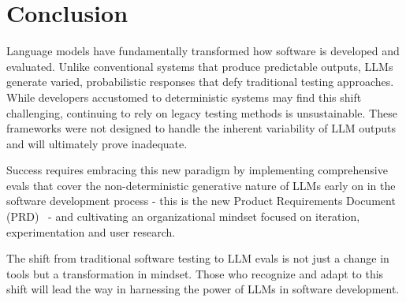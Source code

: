 \section{Conclusion}

Language models have fundamentally transformed how software is developed and evaluated. Unlike conventional systems that produce predictable outputs, LLMs generate varied, probabilistic responses that defy traditional testing approaches. While developers accustomed to deterministic systems may find this shift challenging, continuing to rely on legacy testing methods is unsustainable. These frameworks were not designed to handle the inherent variability of LLM outputs and will ultimately prove inadequate.

Success requires embracing this new paradigm by implementing comprehensive evals that cover the non-deterministic generative nature of LLMs early on in the software development process - this is the new Product Requirements Document (PRD)~ - and cultivating an organizational mindset focused on iteration, experimentation and user research.

The shift from traditional software testing to LLM evals is not just a change in tools but a transformation in mindset. Those who recognize and adapt to this shift will lead the way in harnessing the power of LLMs in software development.
